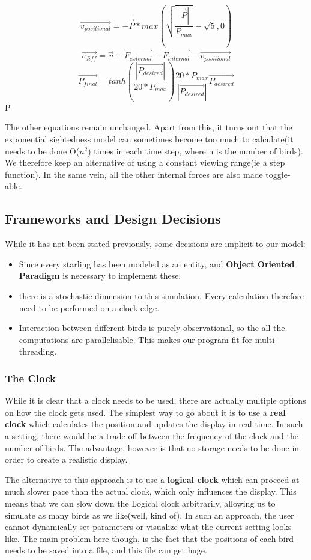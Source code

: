 \documentclass{article}
\begin{document}
\begin{center}
    $$\vec{v_{positional}}=-\vec{P} * max(\sqrt{\frac{|\vec{P}|}{P_{max}}}-\sqrt{5},0)$$
    $$\vec{v_{diff}}=\vec{v}+\vec{F_{external}}-\vec{F_{internal}}-\vec{v_{positional}}$$
    $$\vec{P_{final}}=tanh(\frac{|\vec{P_{desired}}|}{20*P_{max}})\frac{20*P_{max}}{|\vec{P_{desired}}|}\vec{P_{desired}}$$
    P 
\end{center}
The other equations remain unchanged.
Apart from this, it turns out that the exponential sightedness model can sometimes become too much to calculate(it needs to be done O($n^2$) times in each time step, where n is the number of birds). We therefore keep an alternative of using a constant viewing range(ie a step function). In the same vein, all the other internal forces are also made toggle-able. 

\subsection{Frameworks and Design Decisions}
While it has not been stated previously, some decisions are implicit to our model:
\begin{itemize}
    \item Since every starling has been modeled as an entity, and \textbf{Object Oriented Paradigm} is necessary to implement these.
    \item there is a stochastic dimension to this simulation. Every calculation therefore need to be performed on a clock edge.
    \item Interaction between different birds is purely observational, so the all the computations are parallelisable. This makes our program fit for multi-threading.
\end{itemize}
\subsubsection{The Clock}
While it is clear that a clock needs to be used, there are actually multiple options on how the clock gets used. The simplest way to go about it is to use a \textbf{real clock} which calculates the position and updates the display in real time. In such a setting, there would be a trade off between the frequency of the clock and the number of birds. The advantage, however is that no storage needs to be done in order to create a realistic display.

The alternative to this approach is to use a \textbf{logical clock} which can proceed at much slower pace than the actual clock, which only influences the display. This means that we can slow down the Logical clock arbitrarily, allowing us to simulate as many birds as we like(well, kind of). In such an approach, the user cannot dynamically set parameters or visualize what the current setting looks like. The main problem here though, is the fact that the positions of each bird needs to be saved into a file, and this file can get huge. 
\end{document}
